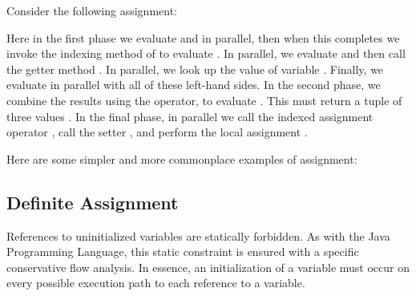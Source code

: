 Consider the following assignment:

Here in the first phase we evaluate  and  in parallel,
then when this completes we invoke the indexing method of
 to evaluate .
In parallel, we evaluate  and then
call the getter method .
In parallel, we look up the value of variable .
Finally, we evaluate  in parallel with all of
these left-hand sides.
In the second phase, we combine the results using the \EXP{+} operator,
to evaluate .
This must return a tuple of three values .
In the final phase, in parallel we
call the indexed assignment operator ,
call the setter ,
and perform the local assignment
.

Here are some simpler and more commonplace examples of assignment:


\subsection{Definite Assignment}


References to uninitialized variables are statically forbidden. As with the
Java Programming Language, this static constraint is ensured with a specific
conservative flow analysis. In essence, an initialization of a variable
must occur on every possible execution path to each reference to a
variable.
